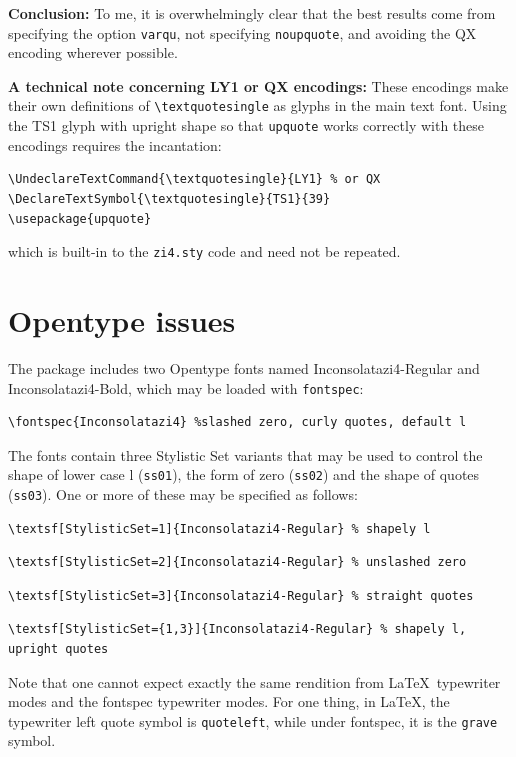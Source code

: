 \documentclass[11pt]{article}
\begin{document}
\textbf{Conclusion:} To me, it is overwhelmingly clear that the best results come from
specifying the option \texttt{varqu}, not specifying \texttt{noupquote}, and avoiding the QX encoding wherever  possible.

\textbf{A technical note concerning LY1 or QX encodings:} These encodings make their own definitions of \verb|\textquotesingle| as glyphs in the main text font. Using the TS1 glyph with upright shape so that \texttt{upquote} works correctly with these encodings requires the incantation:
\begin{verbatim}
\UndeclareTextCommand{\textquotesingle}{LY1} % or QX
\DeclareTextSymbol{\textquotesingle}{TS1}{39}
\usepackage{upquote}
\end{verbatim}
which is built-in to the \texttt{zi4.sty} code and need not be repeated.
\section{Opentype issues} The package includes two Opentype fonts named \textsf{Inconsolatazi4-Regular} and \textsf{Inconsolatazi4-Bold}, which may be loaded with \texttt{fontspec}:
\begin{verbatim}
\fontspec{Inconsolatazi4} %slashed zero, curly quotes, default l
\end{verbatim}
The fonts contain three Stylistic Set variants that may be used to control the shape of lower case l (\texttt{ss01}), the form of zero (\texttt{ss02}) and the shape of quotes (\texttt{ss03}). One or more of these may be specified as follows:
\begin{verbatim}
\textsf[StylisticSet=1]{Inconsolatazi4-Regular} % shapely l
\end{verbatim}
\begin{verbatim}
\textsf[StylisticSet=2]{Inconsolatazi4-Regular} % unslashed zero
\end{verbatim}
\begin{verbatim}
\textsf[StylisticSet=3]{Inconsolatazi4-Regular} % straight quotes
\end{verbatim}
\begin{verbatim}
\textsf[StylisticSet={1,3}]{Inconsolatazi4-Regular} % shapely l, upright quotes
\end{verbatim}
Note that one cannot expect exactly the same rendition from \LaTeX\ typewriter modes and the \textsf{fontspec} typewriter modes. For one thing, in \LaTeX, the typewriter left quote symbol is \texttt{quoteleft}, while under \textsf{fontspec}, it is the \texttt{grave} symbol.
\end{document}

